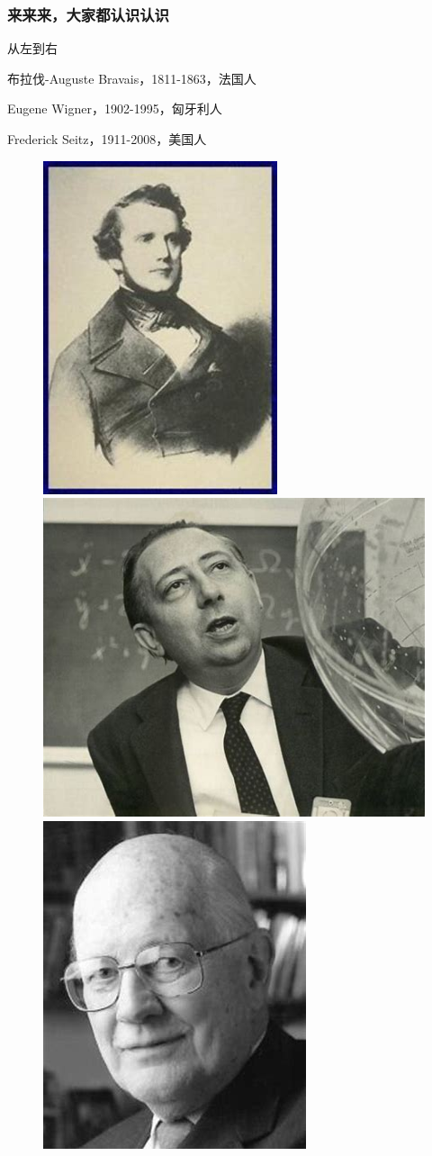 \documentclass[CJK]{beamer}
\begin{document}
\begin{frame}
\frametitle{\bch 来来来，大家都认识认识 \ech}
\bch
从左到右\par
布拉伐-Auguste Bravais，1811-1863，法国人
\par
Eugene Wigner，1902-1995，匈牙利人
\par
Frederick Seitz，1911-2008，美国人
\begin{figure}
\includegraphics[scale=0.21]{bravais}
\includegraphics[scale=0.2]{wigner}
\includegraphics[scale=0.21]{seitz}
\end{figure}



\end{frame}
\end{document}
